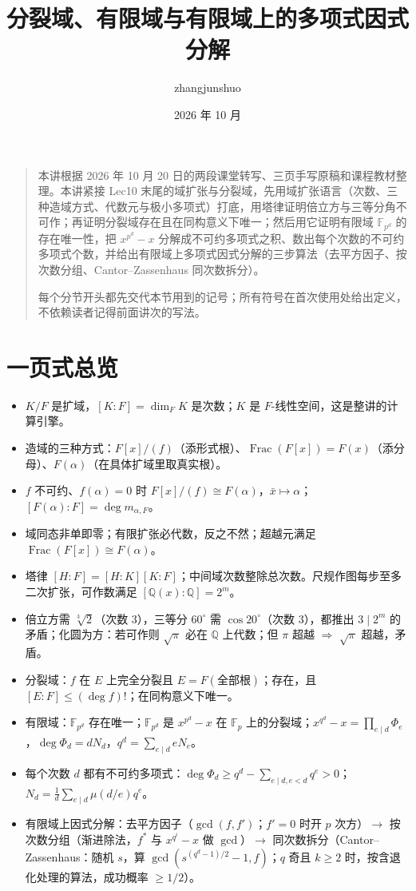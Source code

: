 \documentclass[UTF8,a4paper,11pt]{ctexart}
\title{分裂域、有限域与有限域上的多项式因式分解}\author{zhangjunshuo}\date{2026 年 10 月}
\begin{document}
\maketitle
\begin{quote}
本讲根据 2026 年 10 月 20 日的两段课堂转写、三页手写原稿和课程教材整理。本讲紧接 Lec10 末尾的域扩张与分裂域，先用域扩张语言（次数、三种造域方式、代数元与极小多项式）打底，用塔律证明倍立方与三等分角不可作；再证明分裂域存在且在同构意义下唯一；然后用它证明有限域 $\mathbb F_{p^d}$ 的存在唯一性，把 $x^{p^d}-x$ 分解成不可约多项式之积、数出每个次数的不可约多项式个数，并给出有限域上多项式因式分解的三步算法（去平方因子、按次数分组、Cantor--Zassenhaus 同次数拆分）。

每个分节开头都先交代本节用到的记号；所有符号在首次使用处给出定义，不依赖读者记得前面讲次的写法。
\end{quote}
\tableofcontents\clearpage







\section*{一页式总览}
\begin{itemize}
\item $K/F$ 是扩域，$[K:F]=\dim_F K$ 是次数；$K$ 是 $F$-线性空间，这是整讲的计算引擎。
\item 造域的三种方式：$F[x]/(f)$（添形式根）、$\operatorname{Frac}(F[x])=F(x)$（添分母）、$F(\alpha)$（在具体扩域里取真实根）。
\item $f$ 不可约、$f(\alpha)=0$ 时 $F[x]/(f)\cong F(\alpha)$，$\bar x\mapsto\alpha$；$[F(\alpha):F]=\deg m_{\alpha,F}$。
\item 域同态非单即零；有限扩张必代数，反之不然；超越元满足 $\operatorname{Frac}(F[x])\cong F(\alpha)$。
\item 塔律 $[H:F]=[H:K][K:F]$；中间域次数整除总次数。尺规作图每步至多二次扩张，可作数满足 $[\mathbb Q(x):\mathbb Q]=2^m$。
\item 倍立方需 $\sqrt[3]{2}$（次数 $3$），三等分 $60^\circ$ 需 $\cos20^\circ$（次数 $3$），都推出 $3\mid2^m$ 的矛盾；化圆为方：若可作则 $\sqrt\pi$ 必在 $\mathbb Q$ 上代数；但 $\pi$ 超越 $\Rightarrow$ $\sqrt\pi$ 超越，矛盾。
\item 分裂域：$f$ 在 $E$ 上完全分裂且 $E=F(\text{全部根})$；存在，且 $[E:F]\le(\deg f)!$；在同构意义下唯一。
\item 有限域：$\mathbb F_{p^d}$ 存在唯一；$\mathbb F_{p^d}$ 是 $x^{p^d}-x$ 在 $\mathbb F_p$ 上的分裂域；$x^{q^d}-x=\prod_{e\mid d}\Phi_e$，$\deg\Phi_d=dN_d$，$q^d=\sum_{e\mid d}eN_e$。
\item 每个次数 $d$ 都有不可约多项式：$\deg\Phi_d\ge q^d-\sum_{e\mid d,e<d}q^e>0$；$N_d=\frac1d\sum_{e\mid d}\mu(d/e)q^e$。
\item 有限域上因式分解：去平方因子（$\gcd(f,f')$；$f'=0$ 时开 $p$ 次方）$\to$ 按次数分组（渐进除法，$f^\ast$ 与 $x^{q^i}-x$ 做 $\gcd$）$\to$ 同次数拆分（Cantor--Zassenhaus：随机 $s$，算 $\gcd(s^{(q^d-1)/2}-1,f)$；$q$ 奇且 $k\ge2$ 时，按含退化处理的算法，成功概率 $\ge1/2$）。
\end{itemize}
\end{document}
